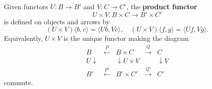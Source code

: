 Given functors $U: B \to B'$ and $V: C \to C'$, the \textbf{product functor}
$$U \times V: B \times C \to B' \times C'$$
is defined on objects and arrows by
$$(U \times V)\langle b, c \rangle = \langle Ub, Vc \rangle, \quad (U \times V)\langle f, g \rangle = \langle Uf, Vg \rangle.$$
Equivalently, $U \times V$ is the unique functor making the diagram
$$\begin{array}{ccc}
B & \xleftarrow{P} & B \times C & \xrightarrow{Q} & C \\
{\scriptstyle U}\downarrow & & \downarrow{\scriptstyle U \times V} & & \downarrow{\scriptstyle V} \\
B' & \xleftarrow{P'} & B' \times C' & \xrightarrow{Q'} & C'
\end{array}$$
commute.
